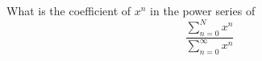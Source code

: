   What is the coefficient of $x^n$ in the power series of
  \[
    \frac{\sum_{n=0}^N x^n}{\sum_{n=0}^\infty x^n}
  \]
